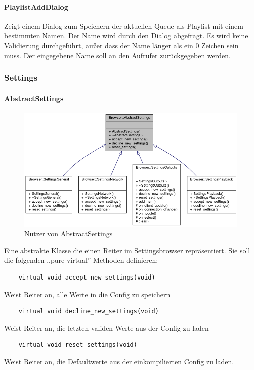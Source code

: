 \paragraph{PlaylistAddDialog}
Zeigt einem Dialog zum Speichern der aktuellen Queue als Playlist mit einem bestimmten Namen. Der Name wird durch den Dialog abgefragt.
Es wird keine Validierung durchgeführt, außer dass der Name länger als ein 0 Zeichen sein muss. Der eingegebene Name soll an den Aufrufer zurückgegeben werden.

\newpage
\subsubsection{Settings}
\paragraph{AbstractSettings}
\begin{figure}[htb!]
	\centering
        \includegraphics[scale=0.5]{AbstractSettings.png}
	\caption{Nutzer von AbstractSettings}
	\label{class_abstract_browser}
\end{figure}
Eine abstrakte Klasse die einen Reiter im Settingsbrowser repräsentiert. 
Sie soll die folgenden ,,pure virtual'' Methoden definieren:

\begin{verbatim}
    virtual void accept_new_settings(void)
\end{verbatim}
Weist Reiter an, alle Werte in die Config zu speichern     
\begin{verbatim}
    virtual void decline_new_settings(void)
\end{verbatim}     
Weist Reiter an, die letzten validen Werte aus der Config zu laden

\begin{verbatim}
    virtual void reset_settings(void)
\end{verbatim}
Weist Reiter an, die Defaultwerte aus der einkompilierten Config zu laden.


